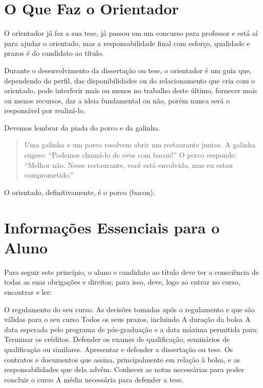 \section{O Que Faz o Orientador}

O orientador já fez a sua tese, já passou em um concurso para professor e está aí para ajudar o orientado, mas a responsabilidade final com esforço, qualidade e prazos é do candidato ao título.

Durante o desenvolvimento da dissertação ou tese, o orientador é um guia que, dependendo do perfil, das disponibilidades ou do relacionamento que cria com o orientado, pode interferir mais ou menos no trabalho deste último, fornecer mais ou menos recursos, dar a ideia fundamental ou não, porém nunca será o responsável por realizá-lo.

Devemos lembrar da piada do porco e da galinha. 
\begin{quote}
    Uma galinha e um porco resolvem abrir um restaurante juntos.
A galinha sugere: ``Podemos chamá-lo de ovos com bacon!''
O porco responde: ``Melhor não. Nesse restaurante, você está envolvida, mas eu estou comprometido.''
\end{quote}
O orientado, definitivamente, é o porco (bacon).


\section{Informações Essenciais para o Aluno}

Para seguir este princípio, o aluno e candidato ao título deve ter a consciência de todas as suas obrigações e direitos; para isso, deve, logo ao entrar no curso, encontrar e ler:

\begin{outline}
\1	O regulamento do seu curso.
\1	As decisões tomadas após o regulamento e que são válidas para o seu curso
\1	Todos os seus prazos, incluindo
\2	A duração da bolsa
\2	A data esperada pelo programa de pós-graduação e a data máxima permitida para:
\3	Terminar os créditos.
\3	Defender os exames de qualificação, seminários de qualificação ou similares.
\3	Apresentar e defender a dissertação ou tese.
\1	Os contratos e documentos que assina, principalmente em relação à bolsa, e as responsabilidades que dela advêm.
\1	Conhecer as notas necessárias para poder concluir o curso
\2	A média necessária para defender a tese.
\end{outline}





